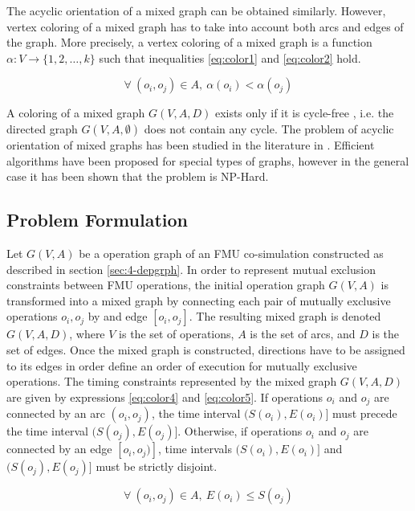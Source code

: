 The acyclic orientation of a mixed graph can be obtained similarly. However, vertex coloring of a mixed graph has to take into account both arcs and edges of the graph. More precisely, a vertex coloring of a mixed graph is a function $\alpha: V \rightarrow \{1, 2, \ldots, k\}$ such that inequalities \ref{eq:color1} and \ref{eq:color2} hold.

\begin{equation}
\forall\ (o_i,o_j) \in A,\ \alpha(o_i) < \alpha(o_j)
\label{eq:color2}
\end{equation}

A coloring of a mixed graph $G(V,A,D)$ exists only if it is cycle-free \cite{ries:2007}, i.e. the directed graph $G(V,A,\emptyset)$ does not contain any cycle. The problem of acyclic orientation of mixed graphs has been studied in the literature in \cite{andreev:2000,sotskov:2002,al-anzi:2006}. Efficient algorithms have been proposed for special types of graphs, however in the general case it has been shown that the problem is NP-Hard.

\subsection{Problem Formulation}

Let $G(V,A)$ be a operation graph of an FMU co-simulation constructed as described in section \ref{sec:4-depgrph}. In order to represent mutual exclusion constraints between FMU operations, the initial operation graph $G(V,A)$ is transformed into a mixed graph by connecting each pair of mutually exclusive operations $o_i, o_j$ by and edge $[o_i, o_j]$. The resulting mixed graph is denoted $G(V,A,D)$, where $V$ is the set of operations, $A$ is the set of arcs, and $D$ is the set of edges. Once the mixed graph is constructed, directions have to be assigned to its edges in order define an order of execution for mutually exclusive operations. The timing constraints represented by the mixed graph $G(V,A,D)$ are given by expressions \ref{eq:color4} and \ref{eq:color5}. If operations $o_i$ and $o_j$ are connected by an arc $(o_i,o_j)$, the time interval $(S(o_i), E(o_i)]$ must precede the time interval $(S(o_j), E(o_j)]$. Otherwise, if operations $o_i$ and $o_j$ are connected by an edge $[o_i,o_j)]$, time intervals $(S(o_i), E(o_i)]$ and $(S(o_j), E(o_j)]$ must be strictly disjoint.

\begin{equation}
\forall\ (o_i,o_j) \in A,\ E(o_i) \leq S(o_j)
\label{eq:color4}
\end{equation}

